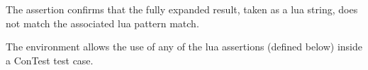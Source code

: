 The \type{\assertStringDoesNotMatch} assertion confirms that the fully expanded 
result, taken as a lua string, does not match the associated lua pattern match. 

\startMkIVCode
\def\assertStringMatches#1#2#3{%
  \directlua{
    thirddata.contests.reportMkIVAssertions(
      not string.match('#1','#2'),
      '#3',
      'Expected [#1] to not match [#2]'
    )
  }
}
\stopMkIVCode

\stopTestSuite

\startTestSuite[assertLua]

The  environment allows the use of any of the lua 
assertions (defined below) inside a ConTest test case. 

\stopTestSuite

\stopchapter